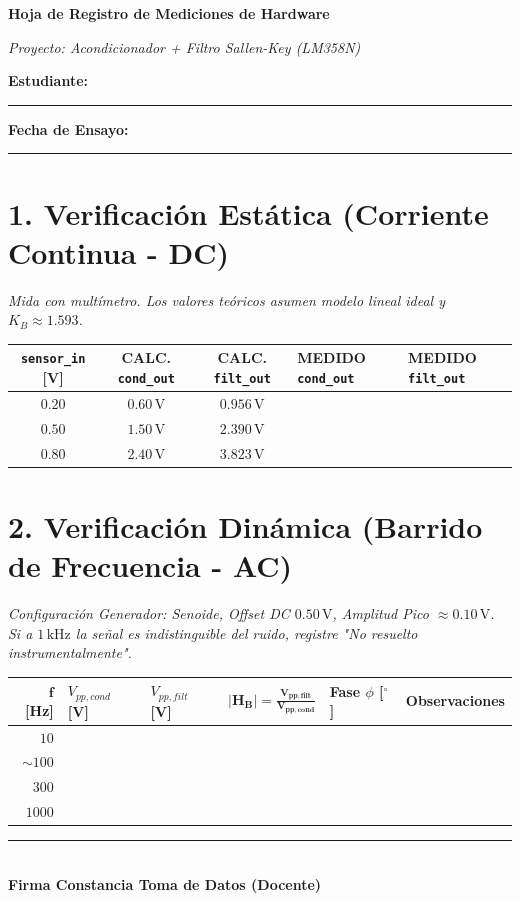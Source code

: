 \documentclass[11pt, a4paper]{article}
\begin{document}
\begin{center}
    {\Large \textbf{Hoja de Registro de Mediciones de Hardware}}
    \par\vspace{0.1cm}
    \textit{Proyecto: Acondicionador + Filtro Sallen-Key (LM358N)}
\end{center}

\noindent\textbf{Estudiante:} \rule{6cm}{0.4pt} \hfill \textbf{Fecha de Ensayo:} \rule{3cm}{0.4pt}

\section*{1. Verificación Estática (Corriente Continua - DC)}
\textit{Mida con multímetro. Los valores teóricos asumen modelo lineal ideal y $K_B \approx 1.593$.}

\begin{center}
\begin{tabularx}{\textwidth}{@{} c c c L L @{}}
\toprule
\textbf{\texttt{sensor\_in} [V]} & \textbf{CALC. \texttt{cond\_out}} & \textbf{CALC. \texttt{filt\_out}} & \textbf{MEDIDO \texttt{cond\_out}} & \textbf{MEDIDO \texttt{filt\_out}} \\ \midrule
$0.20$ & $0.60\,\text{V}$ & $0.956\,\text{V}$ & & \\ \addlinespace[15pt]
$0.50$ & $1.50\,\text{V}$ & $2.390\,\text{V}$ & & \\ \addlinespace[15pt]
$0.80$ & $2.40\,\text{V}$ & $3.823\,\text{V}$ & & \\ \bottomrule
\end{tabularx}
\end{center}

\section*{2. Verificación Dinámica (Barrido de Frecuencia - AC)}
\textit{Configuración Generador: Senoide, Offset DC $0.50\,\text{V}$, Amplitud Pico $\approx 0.10\,\text{V}$.} \\
\textit{Si a $1\,\text{kHz}$ la señal es indistinguible del ruido, registre "No resuelto instrumentalmente".}

\begin{center}
\begin{tabularx}{\textwidth}{@{} r L L L L L @{}}
\toprule
$\bm{f}$ \textbf{[Hz]} & \textbf{$V_{pp,cond}$ [V]} & \textbf{$V_{pp,filt}$ [V]} & $\mathbf{|H_B| = \frac{V_{pp,filt}}{V_{pp,cond}}}$ & \textbf{Fase $\phi$ [$^\circ$]} & \textbf{Observaciones} \\ \midrule
$10$ & & & & & \\ \addlinespace[20pt]
$\sim 100$ & & & & & \\ \addlinespace[20pt]
$300$ & & & & & \\ \addlinespace[20pt]
$1000$ & & & & & \\ \bottomrule
\end{tabularx}
\end{center}

\vspace{2cm}
\noindent\rule{6cm}{0.4pt} \\
\textbf{Firma Constancia Toma de Datos (Docente)}
\end{document}
